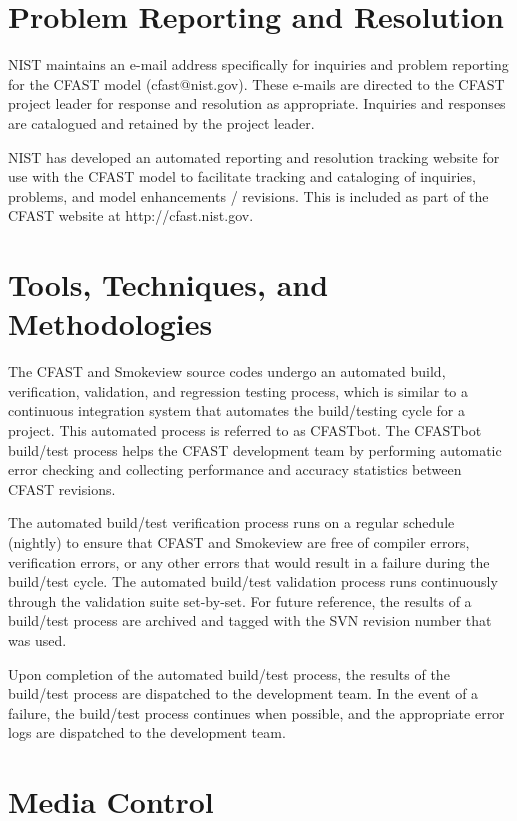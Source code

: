 \section{Problem Reporting and Resolution}

NIST maintains an e-mail address specifically for inquiries and problem reporting for the CFAST model (cfast@nist.gov).  These e-mails are directed to the CFAST project leader for response and resolution as appropriate.  Inquiries and responses are catalogued and retained by the project leader.

NIST has developed an automated reporting and resolution tracking website for use with the CFAST model to facilitate tracking and cataloging of inquiries, problems, and model enhancements / revisions. This is included as part of the CFAST website at http://cfast.nist.gov.

\section{Tools, Techniques, and Methodologies}

The CFAST and Smokeview source codes undergo an automated build, verification, validation, and regression testing process, which is similar to a continuous integration system that automates the build/testing cycle for a project. This automated process is referred to as CFASTbot. The CFASTbot build/test process helps the CFAST development team by performing automatic error checking and collecting performance and accuracy statistics between CFAST revisions.

The automated build/test verification process runs on a regular schedule (nightly) to ensure that CFAST and Smokeview are free of compiler errors, verification errors, or any other errors that would result in a failure during the build/test cycle. The automated build/test validation process runs continuously through the validation suite set-by-set. For future reference, the results of a build/test process are archived and tagged with the SVN revision number that was used.

Upon completion of the automated build/test process, the results of the build/test process are dispatched to the development team. In the event of a failure, the build/test process continues when possible, and the appropriate error logs are dispatched to the development team.

\section{Media Control}

